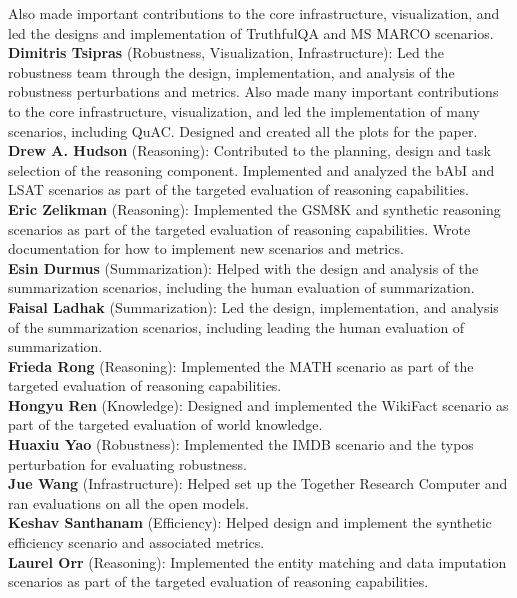 Also made important contributions to the core infrastructure, visualization, and led the designs and implementation of TruthfulQA and MS MARCO scenarios. \\ 
\textbf{Dimitris Tsipras} (Robustness, Visualization, Infrastructure): Led the robustness team through the design, implementation, and analysis of the robustness perturbations and metrics. 
Also made many important contributions to the core infrastructure, visualization, and led the implementation of many \core scenarios, including QuAC. 
Designed and created all the plots for the paper. \\ 
\textbf{Drew A. Hudson} (Reasoning): Contributed to the planning, design and task selection of the reasoning component. Implemented and analyzed the bAbI and LSAT scenarios as part of the targeted evaluation of reasoning capabilities. \\ 
\textbf{Eric Zelikman} (Reasoning): Implemented the GSM8K and synthetic reasoning scenarios as part of the targeted evaluation of reasoning capabilities. 
Wrote documentation for how to implement new scenarios and metrics. \\ 
\textbf{Esin Durmus} (Summarization): Helped with the design and analysis of the summarization scenarios, including the human evaluation of summarization. \\ 
\textbf{Faisal Ladhak} (Summarization): Led the design, implementation, and analysis of the summarization scenarios, including leading the human evaluation of summarization. \\ 
\textbf{Frieda Rong} (Reasoning): Implemented the MATH scenario as part of the targeted evaluation of reasoning capabilities. \\
\textbf{Hongyu Ren} (Knowledge): Designed and implemented the WikiFact scenario as part of the targeted evaluation of world knowledge. \\ 
\textbf{Huaxiu Yao} (Robustness): Implemented the IMDB scenario and the typos perturbation for evaluating robustness. \\
\textbf{Jue Wang} (Infrastructure): Helped set up the Together Research Computer and ran evaluations on all the open models. \\ 
\textbf{Keshav Santhanam} (Efficiency): Helped design and implement the synthetic efficiency scenario and associated metrics. \\ 
\textbf{Laurel Orr} (Reasoning): Implemented the entity matching and data imputation scenarios as part of the targeted evaluation of reasoning capabilities. \\ 
